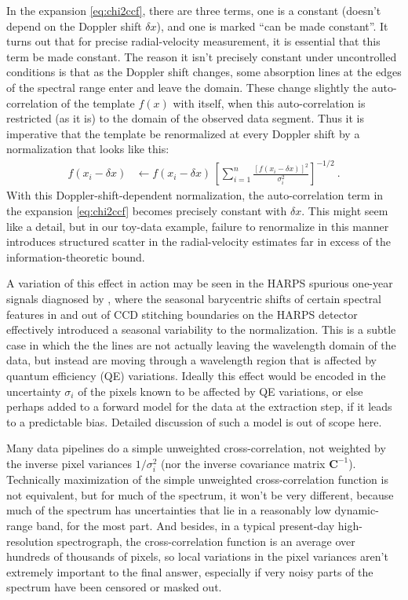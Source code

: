 \documentclass[modern]{aastex631}
\newcommand{\lao}[1]{\boldsymbol{#1}}
\newcommand{\vC}{\lao{C}}
\begin{document}
In the expansion \eqref{eq:chi2ccf}, there are three terms, one is a constant (doesn't depend on the Doppler shift $\delta x$), and one is marked ``can be made constant''.
It turns out that for precise radial-velocity measurement, it is essential that this term be made constant.
The reason it isn't precisely constant under uncontrolled conditions is that as the Doppler shift changes, some absorption lines at the edges of the spectral range enter and leave the domain.
These change slightly the auto-correlation of the template $f(x)$ with itself, when this auto-correlation is restricted (as it is) to the domain of the observed data segment.
Thus it is imperative that the template be renormalized at every Doppler shift by a normalization that looks like this:
\begin{align}
    f(x_i-\delta x) &\leftarrow f(x_i-\delta x)\,\left[\sum_{i=1}^n \frac{[f(x_i-\delta x)]^2}{\sigma_i^2}\right]^{-1/2} ~.
\end{align}
With this Doppler-shift-dependent normalization, the auto-correlation term in the expansion \eqref{eq:chi2ccf} becomes precisely constant with $\delta x$.
This might seem like a detail, but in our toy-data example, failure to renormalize in this manner introduces structured scatter in the radial-velocity estimates far in excess of the information-theoretic bound. 

A variation of this effect in action may be seen in the HARPS spurious one-year signals diagnosed by \citet{Dumusque2015}, where the seasonal barycentric shifts of certain spectral features in and out of CCD stitching boundaries on the HARPS detector effectively introduced a seasonal variability to the normalization. 
This is a subtle case in which the the lines are not actually leaving the wavelength domain of the data, but instead are moving through a wavelength region that is affected by quantum efficiency (QE) variations. 
Ideally this effect would be encoded in the uncertainty $\sigma_i$ of the pixels known to be affected by QE variations, or else perhaps added to a forward model for the data at the extraction step, if it leads to a predictable bias.
Detailed discussion of such a model is out of scope here.

Many data pipelines do a simple unweighted cross-correlation, not weighted by the inverse pixel variances $1/\sigma_i^2$ (nor the inverse covariance matrix $\vC^{-1}$).
Technically maximization of the simple unweighted cross-correlation function is not equivalent, but for much of the spectrum, it won't be very different, because much of the spectrum has uncertainties that lie in a reasonably low dynamic-range band, for the most part.
And besides, in a typical present-day high-resolution spectrograph, the cross-correlation function is an average over hundreds of thousands of pixels, so local variations in the pixel variances aren't extremely important to the final answer, especially if very noisy parts of the spectrum have been censored or masked out.
\end{document}
